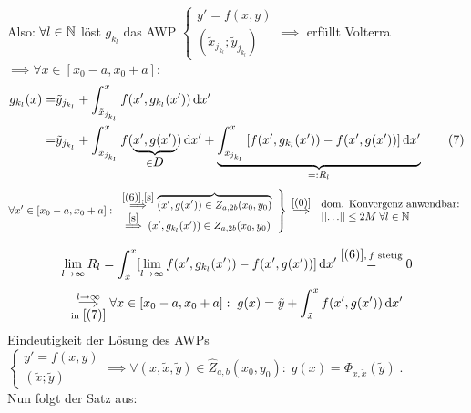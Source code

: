 \documentclass[a4paper]{article}
\begin{document}
\begin{Beweis}
Also: $\forall l\in\operatorname{\mathbb N}$ löst $g_{k_l}$ das AWP $\left\{ \begin{array}{c}
y'=f(x,y)\\
(\tilde{x}_{j_{k_l}}; \tilde{y}_{j_{k_l}})
\end{array}\right. \implies$ erfüllt Volterra $\implies \forall x\in [x_0-a,x_0+a]:$
\needspace{4cm}
\begin{align*}
g_{k_l}(x)=&\tilde{y}_{j_{k_l}}+\int_{\tilde{x}_{j_{k_l}}}^xf(x',g_{k_l}(x'))\dd x'\\
=&\tilde{y}_{j_{k_l}}+
\int_{\tilde{x}_{j_{k_l}}}^x f(\underbrace{x',g(x')}_{\in \mathnode{D}})\dd x'+\underbrace{\int_{\tilde{x}_{j_{k_l}}}^x\left[f(x',g_{k_l}(x'))-f(x',g(x'))\right]\dd x'}_{=:R_l}\tag{$7$}\label{(7)}
\end{align*}
\vspace{1cm}
\[\forall x'\in[x_0-a,x_0+a]:\left.\begin{array}{l}
\overset{\eqref{(6)},\eqref{s}}{\implies} \overbrace{(x',g(x'))\in Z_{a,2b}(x_0,y_0)}^{
\mathord{\tikz[baseline=(A.base), inner sep = 0pt]{\node (A) {};}}}\\
\overset{\eqref{s}}{\implies} (x',g_{k_l}(x'))\in Z_{a,2b}(x_0,y_0)
\end{array}\right\}\overset{\eqref{(0)}}{\implies}
\begin{array}{l}
\text{dom. Konvergenz anwendbar:}\\
|[\ldots]|\le 2M\;\forall l\in\NN
\end{array}
 \]
\[\lim_{l\to\infty}R_l=\int_{\tilde{x}}^x[\lim_{l\to\infty}f(x',g_{k_l}(x'))-f(x',g(x'))]\mathop{}\!\mathrm{d} x'\overset{\eqref{(6)},\,f\text{ stetig}}{=}0\]
\[
\overset{l\to\infty}{\underset{\text{in }\eqref{(7)}}{\implies}} \forall x\in [x_0-a,x_0+a]:\;g(x)=\tilde{y}+\int_{\tilde{x}}^xf(x',g(x'))\mathop{}\!\mathrm{d} x'
\]
Eindeutigkeit der Lösung des AWPs $\left\{ \begin{array}{c}
y'=f(x,y)\\
(\tilde{x};\tilde{y})
\end{array}\right.\implies \forall (x,\tilde{x},\tilde{y})\in\hat{Z}_{a,b}(x_0,y_0):\;g(x)=\Phi_{x,\tilde{x}}(\tilde{y})\;$.\\
Nun folgt der Satz aus:\\
\vspace{0.5mm}
\\
\end{Beweis}
\end{document}
